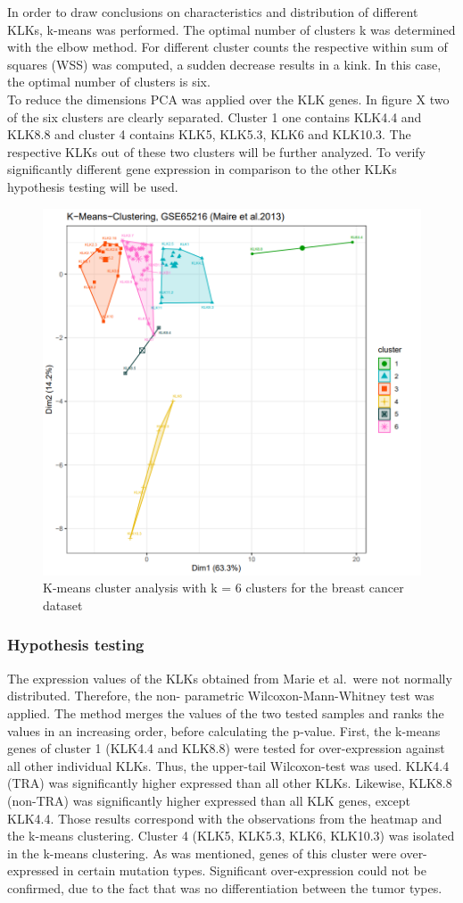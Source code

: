 \documentclass[
]{article}
\begin{document}
In order to draw conclusions on characteristics and distribution of
different KLKs, k-means was performed. The optimal number of clusters k
was determined with the elbow method. For different cluster counts the
respective within sum of squares (WSS) was computed, a sudden decrease
results in a kink. In this case, the optimal number of clusters is
six.\\
To reduce the dimensions PCA was applied over the KLK genes. In figure X
two of the six clusters are clearly separated. Cluster 1 one contains
KLK4.4 and KLK8.8 and cluster 4 contains KLK5, KLK5.3, KLK6 and KLK10.3.
The respective KLKs out of these two clusters will be further analyzed.
To verify significantly different gene expression in comparison to the
other KLKs hypothesis testing will be used.

\begin{figure}

{\centering \includegraphics[width=0.5\linewidth]{images/kmeans_6_breast} 

}

\caption{K-means cluster analysis with k = 6 clusters for the breast cancer dataset}\label{fig:K-means plot - breast }
\end{figure}

\hypertarget{hypothesis-testing}{%
\subsubsection{Hypothesis testing}\label{hypothesis-testing}}

The expression values of the KLKs obtained from Marie et al.~were not
normally distributed. Therefore, the non- parametric
Wilcoxon-Mann-Whitney test was applied. The method merges the values of
the two tested samples and ranks the values in an increasing order,
before calculating the p-value. First, the k-means genes of cluster 1
(KLK4.4 and KLK8.8) were tested for over-expression against all other
individual KLKs. Thus, the upper-tail Wilcoxon-test was used. KLK4.4
(TRA) was significantly higher expressed than all other KLKs. Likewise,
KLK8.8 (non-TRA) was significantly higher expressed than all KLK genes,
except KLK4.4. Those results correspond with the observations from the
heatmap and the k-means clustering. Cluster 4 (KLK5, KLK5.3, KLK6,
KLK10.3) was isolated in the k-means clustering. As was mentioned, genes
of this cluster were over-expressed in certain mutation types.
Significant over-expression could not be confirmed, due to the fact that
was no differentiation between the tumor types.
\end{document}
